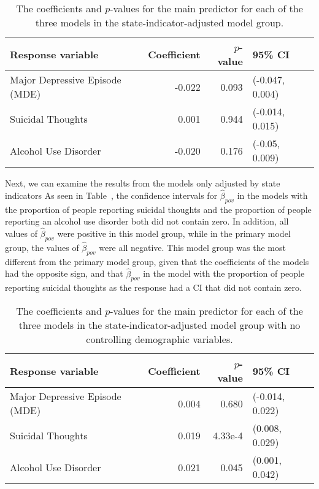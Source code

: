 \documentclass{article}
\begin{document}
\begin{table}[t]
\begin{center}
\begin{tabular}{l r r l}
    \toprule
    Response variable & Coefficient & $p$-value & 95\% CI\\
    \midrule
    Major Depressive Episode (MDE) & -0.022 & 0.093 & (-0.047, 0.004)\\
    Suicidal Thoughts & 0.001 & 0.944 & (-0.014, 0.015)\\
    Alcohol Use Disorder & -0.020 & 0.176 & (-0.05, 0.009)\\
    \bottomrule
\end{tabular}
\caption{\label{tab:state-ind-model-results} The coefficients and $p$-values
    for the main predictor for each of the three models
    in the state-indicator-adjusted model group.
}
\end{center}
\end{table}

Next, we can examine the results
from the models only adjusted by state indicators
As seen in Table~\label{tab:state-ind-only-model-results},
the confidence intervals for $\hat{\beta}_{pov}$
in the models with the proportion of people
reporting suicidal thoughts
and the proportion of people reporting an alcohol use disorder
both did not contain zero.
In addition, all values of $\hat{\beta}_{pov}$
were positive in this model group,
while in the primary model group,
the values of $\hat{\beta}_{pov}$
were all negative.
This model group was the most different from the primary model group,
given that the coefficients of the models had the opposite sign,
and that $\hat{\beta}_{pov}$ in the model
with the proportion of people reporting suicidal thoughts
as the response had a CI that did not contain zero.

\begin{table}[t]
\begin{center}
\begin{tabular}{l r r l}
    \toprule
    Response variable & Coefficient & $p$-value & 95\% CI\\
    \midrule
    Major Depressive Episode (MDE) & 0.004 & 0.680 & (-0.014, 0.022)\\
    Suicidal Thoughts & 0.019 & 4.33e-4 & (0.008, 0.029)\\
    Alcohol Use Disorder & 0.021 & 0.045 & (0.001, 0.042)\\
    \bottomrule
\end{tabular}
\caption{\label{tab:state-ind-only-model-results} The coefficients and $p$-values
    for the main predictor for each of the three models
    in the state-indicator-adjusted model group with no controlling demographic variables.
}
\end{center}
\end{table}
\end{document}
